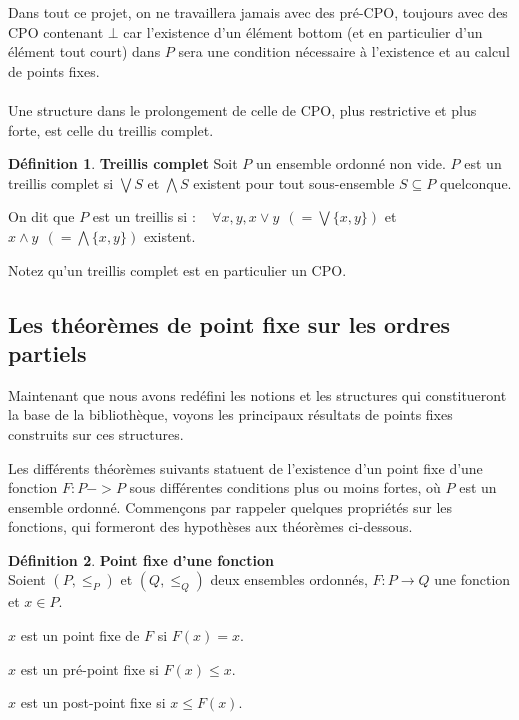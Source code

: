\documentclass{article}
\theoremstyle{definition}
\newtheorem{definition}{Définition}[section]
\begin{document}
Dans tout ce projet, on ne travaillera jamais avec des pré-CPO, toujours avec des CPO contenant $\bot$ car l'existence d'un élément bottom (et en particulier d'un élément tout court) dans $P$ sera une condition nécessaire à l'existence et au calcul de points fixes.

\paragraph{}

Une structure dans le prolongement de celle de CPO, plus restrictive et plus forte, est celle du treillis complet.

\begin{definition}{\textbf{Treillis complet}}
Soit $P$ un ensemble ordonné non vide. $P$ est un treillis complet si $\bigvee S$ et $\bigwedge S$ existent pour tout sous-ensemble $S \subseteq P$ quelconque.

On dit que $P$ est un treillis si : ~ $\forall x, y, x \vee y ~~ (= \bigvee \{x,y\})$ et $x \wedge y ~~ (= \bigwedge \{x,y\})$ existent.
\end{definition}
Notez qu'un treillis complet est en particulier un CPO.

\subsection{Les théorèmes de point fixe sur les ordres partiels}

Maintenant que nous avons redéfini les notions et les structures qui constitueront la base de la bibliothèque, voyons les principaux résultats de points fixes construits sur ces structures.

Les différents théorèmes suivants statuent de l'existence d'un point fixe d'une fonction $F : P -> P$ sous différentes conditions plus ou moins fortes, où $P$ est un ensemble ordonné. Commençons par rappeler quelques propriétés sur les fonctions, qui formeront des hypothèses aux théorèmes ci-dessous.

\begin{definition}{\textbf{Point fixe d'une fonction\\}}
Soient $(P, \leq_P)$ et $(Q, \leq_Q)$ deux ensembles ordonnés, $F : P \rightarrow Q$ une fonction et $x \in P$. 

$x$ est un point fixe de $F$ si $F(x) = x$.

$x$ est un pré-point fixe si $F(x) \leq x$.

$x$ est un post-point fixe si $x \leq F(x)$.
\end{definition}
\end{document}
